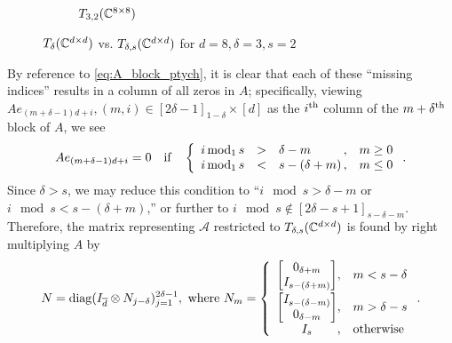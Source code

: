 \begin{figure}
\begin{subfigure}[b]{0.4\textwidth}
    \caption{$T_{3, 2}(\mathbb{C}^{8 \times 8})$}
  \end{subfigure}
  \caption{$T_\delta(\mathbb{C}^{d \times d})$ vs. $T_{\delta, s}(\mathbb{C}^{d \times d})$ for $d = 8, \delta = 3, s = 2$}
  \label{fig:T_delta_s}  
\end{figure}

By reference to \eqref{eq:A_block_ptych}, it is clear that each of these ``missing indices'' results in a column of all zeros in $A$; specifically, viewing $A e_{(m + \delta - 1)d + i}, (m, i) \in [2 \delta - 1]_{1 - \delta} \times [d]$ as the $i^{\text{th}}$ column of the $m + \delta^{\text{th}}$ block of $A$, we see \[A e_{(m + \delta - 1) d + i} = 0\quad \text{if} \quad \left\{\begin{array}{rcl@{\,,\quad}l} i \mod_1 s & > & \delta - m & m \ge 0 \\ i \mod_1 s & < & s - (\delta + m) & m \le 0 \end{array}\right..\]  Since $\delta > s$, we may reduce this condition to ``$i \mod s > \delta - m$ or $i \mod s < s - (\delta + m)$,'' or further to $i \mod s \notin [2 \delta - s + 1]_{s - \delta - m}$.  Therefore, the matrix representing $\mathcal{A}$ restricted to $T_{\delta, s}(\mathbb{C}^{d \times d})$ is found by right multiplying $A$ by \begin{equation}N = \diag(I_{\dbar} \otimes N_{j - \delta})_{j = 1}^{2 \delta - 1},\ \text{where} \ N_m = \left\{\begin{array}{c@{,\quad}l} \begin{bmatrix} 0_{\delta + m} \\ I_{s - (\delta + m)} \end{bmatrix} & m < s - \delta \vspace{2pt}\\ \begin{bmatrix} I_{s - (\delta - m)} \\ 0_{\delta - m} \end{bmatrix} & m > \delta - s \\ I_s & \text{otherwise} \end{array}\right.. \label{eq:N_and_N_m}\end{equation}

